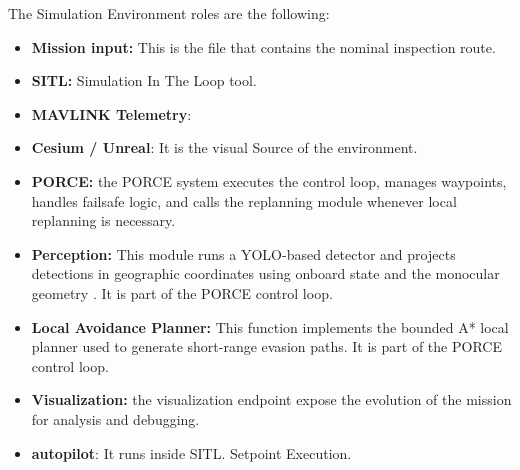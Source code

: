 \documentclass[drones,article,submit,moreauthors]{Definitions/mdpi}
\begin{document}
The Simulation Environment roles are the following:
\begin{itemize}
    \item \textbf{Mission input:} This is the file that contains the nominal inspection route.
    \item \textbf{SITL:} Simulation In The Loop tool.
    \item \textbf{MAVLINK Telemetry}:
    \item \textbf{Cesium / Unreal}: It is the visual Source of the environment. 
    \item \textbf{PORCE:} the PORCE system executes the control loop, manages waypoints, handles failsafe logic, and calls the replanning module whenever local replanning is necessary.
    \item \textbf{Perception:} This module runs a YOLO-based detector and projects detections in geographic coordinates using onboard state and the monocular geometry \cite{alaez2023real}. It is part of the PORCE control loop. 
    \item \textbf{Local Avoidance Planner:} This function implements the bounded A* local planner used to generate short-range evasion paths. It is part of the PORCE control loop. 
    \item \textbf{Visualization:} the visualization endpoint expose the evolution of the mission for analysis and debugging.
    \item \textbf{autopilot}: It runs inside SITL. Setpoint Execution. 
\end{itemize}
\end{document}
